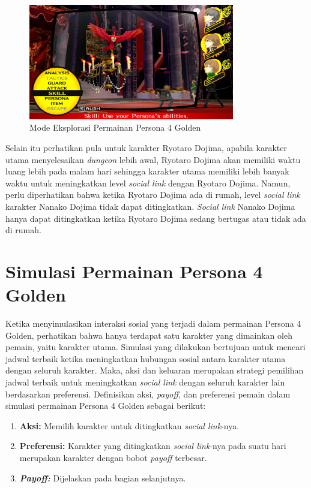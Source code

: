 \begin{figure}[htbp]
    \centering
    \includegraphics[width=0.8\textwidth]{resources/Dokumentasi/Screenshot (377).png}
    \caption{\label{dungeon}Mode Eksplorasi Permainan Persona 4 Golden}
\end{figure}

Selain itu perhatikan pula untuk karakter Ryotaro Dojima, apabila karakter utama menyelesaikan \textit{dungeon} lebih awal, Ryotaro Dojima akan memiliki waktu luang lebih pada malam hari sehingga karakter utama memiliki lebih banyak waktu untuk meningkatkan level \textit{social link} dengan Ryotaro Dojima. Namun, perlu diperhatikan bahwa ketika Ryotaro Dojima ada di rumah, level \textit{social link} karakter Nanako Dojima tidak dapat ditingkatkan. \textit{Social link} Nanako Dojima hanya dapat ditingkatkan ketika Ryotaro Dojima sedang bertugas atau tidak ada di rumah.


\section{Simulasi Permainan Persona 4 Golden}
Ketika menyimulasikan interaksi sosial yang terjadi dalam permainan Persona 4 Golden, perhatikan bahwa hanya terdapat satu karakter yang dimainkan oleh pemain, yaitu karakter utama. Simulasi yang dilakukan bertujuan untuk mencari jadwal terbaik ketika meningkatkan hubungan sosial antara karakter utama dengan seluruh karakter. Maka, aksi dan keluaran merupakan strategi pemilihan jadwal terbaik untuk meningkatkan \textit{social link} dengan seluruh karakter lain berdasarkan preferensi. Definisikan aksi, \textit{payoff}, dan preferensi pemain dalam simulasi permainan Persona 4 Golden sebagai berikut:

\begin{enumerate}
    \item \textbf{Aksi:} Memilih karakter untuk ditingkatkan \textit{social link}-nya.
    \item \textbf{Preferensi:} Karakter yang ditingkatkan \textit{social link}-nya pada suatu hari merupakan karakter dengan bobot \textit{payoff} terbesar.
    \item \textbf{\textit{Payoff:}} Dijelaskan pada bagian selanjutnya.
\end{enumerate}

